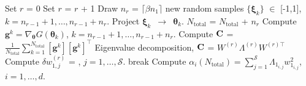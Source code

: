 \begin{breakablealgorithm}
\begin{algorithmic}[1]
	\State Set $r$ = 0
	\Loop
		\State Set $r$ = $r$ + 1
		\State Draw $n_r$ = $\lceil \beta n_1 \rceil$ new random samples 
                $\{\bm{\xi}_k\}$ $\in$ [-1,1], $k = n_{r-1}+1,\ldots,n_{r-1}+n_r$.
		\State Project $\bm{\xi}_k$~$\rightarrow$~$\bm{\theta}_k$.
		\State $N_\text{total}$ = $N_\text{total}$ + $n_r$ 
		\State Compute $\bm{g}^k = \nabla_{\bm{\theta}}G(\bm\theta_k)$, 
             	$k=n_{r-1}+1, \ldots, n_{r-1}+n_r$.  
		\State Compute $\mathbf{{C}}$ = 
        	$\frac{1}{N_\text{total}}\sum\limits_{k=1}^{N_\text{total}}[\bm{g}^k][\bm{g}^k]^\top$
		\State Eigenvalue decomposition, $\mathbf{{C}}$ = $W^{(r)}\Lambda^{(r)} W^{(r)\top}$
		\State Compute $\delta w_{1,j}^{(r)}$ = 
                       , 
                       $j = 1,\ldots,\mathcal{S}$.
			\State break
		\EndIf
	\EndLoop
	\State Compute $\alpha_i(N_\text{total}) = \sum\limits_{j=1}^{\mathcal{S}} \Lambda_{1_{i,j}}w_{1_{i,j}}^2$,
	$i=1,\ldots,d$.
	
    \EndProcedure
  \end{algorithmic}
  \label{alg:grad}
\end{breakablealgorithm}
\bigskip

